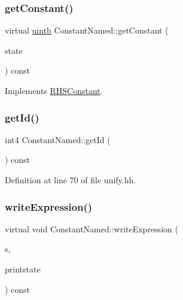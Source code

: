 \subsubsection{\texorpdfstring{getConstant()}{getConstant()}}
{\footnotesize\ttfamily virtual \mbox{\hyperlink{types_8h_a2db313c5d32a12b01d26ac9b3bca178f}{uintb}} Constant\+Named\+::get\+Constant (\begin{DoxyParamCaption}\item[{\mbox{\hyperlink{class_unify_state}{Unify\+State}} \&}]{state }\end{DoxyParamCaption}) const\hspace{0.3cm}{\ttfamily [virtual]}}



Implements \mbox{\hyperlink{class_r_h_s_constant_a941b5d2898cbce985a3ef9c5db6fa458}{R\+H\+S\+Constant}}.

\mbox{\label{class_constant_named_aa8ac030fb4ea24762701635214de0c66}} 
\subsubsection{\texorpdfstring{getId()}{getId()}}
{\footnotesize\ttfamily int4 Constant\+Named\+::get\+Id (\begin{DoxyParamCaption}\item[{void}]{ }\end{DoxyParamCaption}) const\hspace{0.3cm}{\ttfamily [inline]}}



Definition at line 70 of file unify.\+hh.

\mbox{\label{class_constant_named_afb9ee047f745a300c7bfa84735857211}} 
\subsubsection{\texorpdfstring{writeExpression()}{writeExpression()}}
{\footnotesize\ttfamily virtual void Constant\+Named\+::write\+Expression (\begin{DoxyParamCaption}\item[{ostream \&}]{s,  }\item[{\mbox{\hyperlink{class_unify_c_printer}{Unify\+C\+Printer}} \&}]{printstate }\end{DoxyParamCaption}) const\hspace{0.3cm}{\ttfamily [virtual]}}



